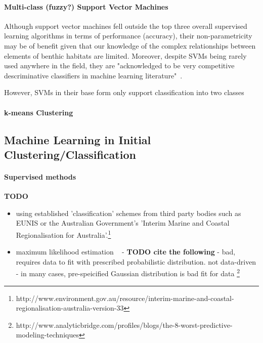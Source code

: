 \documentclass[12pt]{article}
\begin{document}
            \paragraph{Multi-class (fuzzy?) Support Vector Machines}
            Although support vector machines fell outside the top three overall supervised learning algorithms in terms of performance (accuracy), their non-parametricity may be of benefit given that our knowledge of the complex relationships between elements of benthic habitats are limited. Moreover, despite SVMs being rarely used anywhere in the field, they are "acknowledged to be very competitive descriminative classifiers in machine learning literature"~\citep{ahsan11}.

            However, SVMs in their base form only support classification into two classes

            \paragraph{k-means Clustering}

            \subsection{Machine Learning in Initial Clustering/Classification}

            \paragraph{Supervised methods}
            \textbf{TODO}
            \begin{itemize}
            \item using established 'classification' schemes from third party bodies such as EUNIS or the Australian Government's 'Interim Marine and Coastal Regionalisation for Australia'.\footnote{http://www.environment.gov.au/resource/interim-marine-and-coastal-regionalisation-australia-version-33}
            \item maximum likelihood estimation ~\citep*{micallef12} - \textbf{TODO cite the following} - bad, requires data to fit with prescribed probabilistic distribution. not data-driven  - in many cases, pre-speicified Gaussian distribution is bad fit for data \footnote{http://www.analyticbridge.com/profiles/blogs/the-8-worst-predictive-modeling-techniques}
            \end{itemize}
\end{document}
